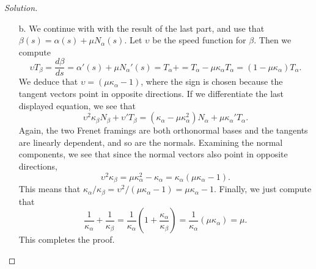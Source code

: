 \documentclass[Shifrin_Solutions_Spring_2015]{subfiles}
\begin{document}
\begin{proof}[Solution]
\begin{itemize}
\item[b.] We continue with with the result of the last part, and use that $\beta(s) = \alpha(s) + \mu N_{\alpha}(s)$. Let $\upsilon$ be the speed function for $\beta$. Then we compute
\[
\upsilon T_{\beta} = \dfrac{d\beta}{ds} = \alpha'(s) + \mu N_{\alpha}'(s) = T_{\alpha} +  = T_{\alpha} -\mu\kappa_{\alpha}T_{\alpha}  = (1 - \mu \kappa_{\alpha} ) T_{\alpha}.
\]
We deduce that  $\upsilon = (\mu \kappa_{\alpha} - 1)$, where the sign is chosen because the tangent vectors point in opposite directions.  If we differentiate the last displayed equation, we see that
\[
\upsilon^2 \kappa_{\beta} N_{\beta} + \upsilon' T_{\beta} = (\kappa_{\alpha} - \mu \kappa_{\alpha}^2) N_{\alpha} + \mu \kappa_{\alpha}' T_{\alpha} .
\]
Again, the two Frenet framings are both orthonormal bases and the tangents are linearly dependent, and so are the normals. Examining the normal components, we see that  since the normal vectors also point in opposite directions,
\[
\upsilon^2 \kappa_{\beta} = \mu \kappa_{\alpha}^2 - \kappa_{\alpha} = \kappa_{\alpha} ( \mu \kappa_{\alpha} - 1) .
\]
This means that $\kappa_{\alpha}/\kappa_{\beta} = \upsilon^2 / (\mu \kappa_{\alpha} - 1) = \mu \kappa_{\alpha} - 1$. Finally, we just compute that
\[
\dfrac{1}{\kappa_{\alpha}} + \dfrac{1}{\kappa_{\beta}} = \dfrac{1}{\kappa_{\alpha}} \left( 1 + \dfrac{\kappa_{\alpha}}{\kappa_{\beta}} \right) = \dfrac{1}{\kappa_{\alpha}} ( \mu \kappa_{\alpha} ) = \mu .
\]
This completes the proof.
\end{itemize}
\end{proof}

\vspace{.5cm}

\end{document}
